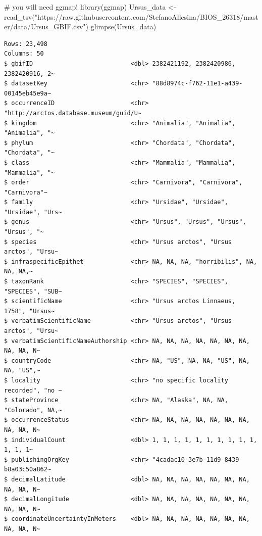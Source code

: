 \documentclass[
  letterpaper,
  DIV=11,
  numbers=noendperiod]{scrreprt}
\newenvironment{Shaded}{\begin{snugshade}}{\end{snugshade}}
\newcommand{\CommentTok}[1]{\textcolor[rgb]{0.37,0.37,0.37}{#1}}
\newcommand{\FunctionTok}[1]{\textcolor[rgb]{0.28,0.35,0.67}{#1}}
\newcommand{\NormalTok}[1]{\textcolor[rgb]{0.00,0.23,0.31}{#1}}
\newcommand{\OtherTok}[1]{\textcolor[rgb]{0.00,0.23,0.31}{#1}}
\newcommand{\StringTok}[1]{\textcolor[rgb]{0.13,0.47,0.30}{#1}}
\begin{document}
\begin{Shaded}
\begin{Highlighting}[]
\CommentTok{\# you will need ggmap!}
\FunctionTok{library}\NormalTok{(ggmap)}
\NormalTok{Ursus\_data }\OtherTok{\textless{}{-}} \FunctionTok{read\_tsv}\NormalTok{(}\StringTok{"https://raw.githubusercontent.com/StefanoAllesina/BIOS\_26318/master/data/Ursus\_GBIF.csv"}\NormalTok{)}
\FunctionTok{glimpse}\NormalTok{(Ursus\_data)}
\end{Highlighting}
\end{Shaded}

\begin{verbatim}
Rows: 23,498
Columns: 50
$ gbifID                           <dbl> 2382421192, 2382420986, 2382420916, 2~
$ datasetKey                       <chr> "88d8974c-f762-11e1-a439-00145eb45e9a~
$ occurrenceID                     <chr> "http://arctos.database.museum/guid/U~
$ kingdom                          <chr> "Animalia", "Animalia", "Animalia", "~
$ phylum                           <chr> "Chordata", "Chordata", "Chordata", "~
$ class                            <chr> "Mammalia", "Mammalia", "Mammalia", "~
$ order                            <chr> "Carnivora", "Carnivora", "Carnivora"~
$ family                           <chr> "Ursidae", "Ursidae", "Ursidae", "Urs~
$ genus                            <chr> "Ursus", "Ursus", "Ursus", "Ursus", "~
$ species                          <chr> "Ursus arctos", "Ursus arctos", "Ursu~
$ infraspecificEpithet             <chr> NA, NA, NA, "horribilis", NA, NA, NA,~
$ taxonRank                        <chr> "SPECIES", "SPECIES", "SPECIES", "SUB~
$ scientificName                   <chr> "Ursus arctos Linnaeus, 1758", "Ursus~
$ verbatimScientificName           <chr> "Ursus arctos", "Ursus arctos", "Ursu~
$ verbatimScientificNameAuthorship <chr> NA, NA, NA, NA, NA, NA, NA, NA, NA, N~
$ countryCode                      <chr> NA, "US", NA, NA, "US", NA, NA, "US",~
$ locality                         <chr> "no specific locality recorded", "no ~
$ stateProvince                    <chr> NA, "Alaska", NA, NA, "Colorado", NA,~
$ occurrenceStatus                 <chr> NA, NA, NA, NA, NA, NA, NA, NA, NA, N~
$ individualCount                  <dbl> 1, 1, 1, 1, 1, 1, 1, 1, 1, 1, 1, 1, 1~
$ publishingOrgKey                 <chr> "4cadac10-3e7b-11d9-8439-b8a03c50a862~
$ decimalLatitude                  <dbl> NA, NA, NA, NA, NA, NA, NA, NA, NA, N~
$ decimalLongitude                 <dbl> NA, NA, NA, NA, NA, NA, NA, NA, NA, N~
$ coordinateUncertaintyInMeters    <dbl> NA, NA, NA, NA, NA, NA, NA, NA, NA, N~

\end{verbatim}
\end{document}
